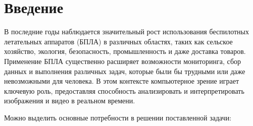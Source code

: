 \chapter*{Введение}
\label{ch:intro}

    В последние годы наблюдается значительный рост использования беспилотных летательных аппаратов (БПЛА) в различных областях, таких как сельское хозяйство, экология, безопасность, промышленность и даже доставка товаров. Применение БПЛА существенно расширяет возможности мониторинга, сбор данных и выполнения различных задач, которые были бы трудными или даже невозможными для человека. В этом контексте компьютерное зрение играет ключевую роль, предоставляя способность анализировать и интерпретировать изображения и видео в реальном времени.

    Можно выделить основные потребности в решении поставленной задачи:
